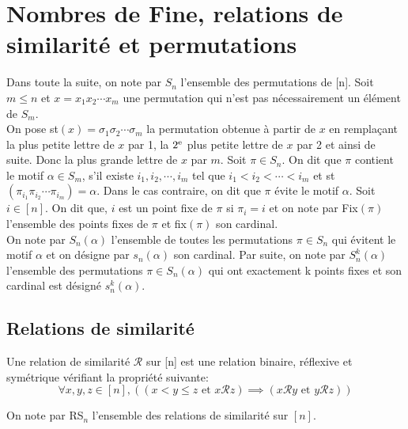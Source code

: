 \chapter{Nombres de Fine, relations de similarité et permutations}
Dans toute la suite, on note par $S_{n}$ l'ensemble des permutations de [n]. Soit $m\leq n$ et $x = x_{1}x_{2}\cdots x_{m} $ une permutation qui n'est pas nécessairement un élément de $ S_{m} $.\\ On pose st$(x) = \sigma_{1}\sigma_{2}\cdots \sigma_{m}$ la permutation obtenue à partir de $x$ en remplaçant
la plus petite lettre de $x$ par 1, la $2\textsuperscript{e}$ plus petite lettre de $x$ par 2 et ainsi
de suite. Donc la plus grande lettre de $x$ par $m$. Soit $\pi \in S_{n}$. On dit que $\pi $ contient le
motif $\alpha \in S_{m}$, s'il existe $i_{1},i_{2}, \cdots, i_{m}$ tel que $i_{1}<i_{2}< \cdots
	<i_{m}$ et st$(\pi_{i_{1}}\pi_{i_{2}}\cdots \pi_{i_{m}})=\alpha$. Dans le cas contraire, on dit que $\pi$ évite le motif $\alpha$.
Soit $i\in [n]$. On dit que, $i$ est un point fixe de $\pi$ si $\pi_{i}=i$ et on note par Fix$(\pi)$ l'ensemble des points fixes de $\pi$ et fix$(\pi)$ son cardinal.\\ On note par  $S_{n}(\alpha)$ l'ensemble
de toutes les permutations $\pi \in S_{n}$ qui évitent le motif $\alpha$ et on désigne par $s_{n}(\alpha)$ son cardinal. Par suite, on note par $S_{n}^k(\alpha)$ l'ensemble des permutations $\pi \in S_{n}(\alpha)$ qui ont exactement k points fixes et son cardinal est désigné $s_{n}^{k}(\alpha)$.
\vspace{5pt}


\section{Relations de similarité }
\begin{definition}
	\begin{rm}
		Une relation de similarité $\mathcal{R}$ sur [n] est une relation binaire, réflexive et symétrique
		vérifiant la propriété suivante:
		$$\forall x, y, z \in [n], \left((x<y\leq z \text{ et } x\mathcal{R}z) \implies
			(x\mathcal{R}y \text{ et } y\mathcal{R}z)\right) $$
	\end{rm}
\end{definition}
On note par RS$_{n}$ l'ensemble des relations de similarité sur $[n]$.

